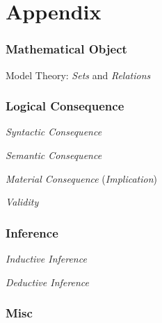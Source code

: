\part{Appendix}\label{sec:appendix}

\section{Mathematical Object}\label{sec:mathematical_object}

Model Theory: \emph{Sets} and \emph{Relations}



\section{Logical Consequence}\label{sec:logical_consequence}

\emph{Syntactic Consequence}

\emph{Semantic Consequence}

\emph{Material Consequence} (\emph{Implication})

\emph{Validity}



\section{Inference}\label{sec:mathematical_inference}

\emph{Inductive Inference}

\emph{Deductive Inference}



\section{Misc}

